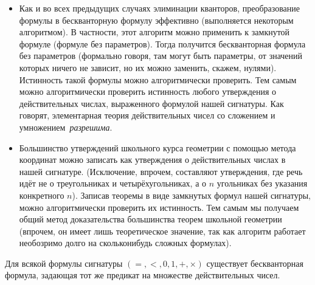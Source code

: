 \begin{itemize}
это будет множество $p^2-4q\ge 0$, которое оказывается полуалгебраическим
в полном согласии с теоремой Тарского\ч Зайденберга.
Про аналогичные критерии разрешимости уравнений большей степени в школе
не учат, но теорема Тарского\ч Зайденберга гарантирует их
существование.
        \item
Как и во всех предыдущих случаях элиминации кванторов,
преобразование формулы в бескванторную формулу эффективно
(выполняется некоторым алгоритмом). В частности, этот алгоритм
можно применить к замкнутой формуле (формуле
без параметров). Тогда
получится бескванторная формула без параметров (формально
говоря, там могут быть параметры, от значений которых ничего
не зависит, но их можно заменить, скажем, нулями). Истинность
такой формулы можно алгоритмически проверить. Тем самым можно
алгоритмически проверить истинность любого утверждения о
действительных числах, выраженного формулой нашей сигнатуры. Как
говорят, элементарная теория действительных чисел со сложением и
умножением~\emph{разрешима}.%
%
        \item
Большинство утверждений школьного курса геометрии с помощью
метода координат можно записать как утверждения о действительных
числах в нашей сигнатуре. (Исключение, впрочем,
составляют утверждения,
где речь идёт не о треугольниках и четырёхугольниках, а о $n$\д
угольниках без указания конкретного $n$). Записав теоремы в
виде замкнутых формул нашей сигнатуры, можно алгоритмически
проверить их истинность. Тем самым мы получаем общий метод
доказательства большинства теорем школьной геометрии (впрочем,
он имеет лишь теоретическое значение, так как алгоритм работает
необозримо долго на сколько\д нибудь сложных формулах).
\end{itemize}

\begin{theorem}
%
        \label{seidenberg-tarski-theorem}%
Для всякой формулы сигнатуры $({=},{<},0,1,{+},{\times})$ существует
бескванторная формула, задающая тот же предикат на множестве
действительных чисел.
\end{theorem}


